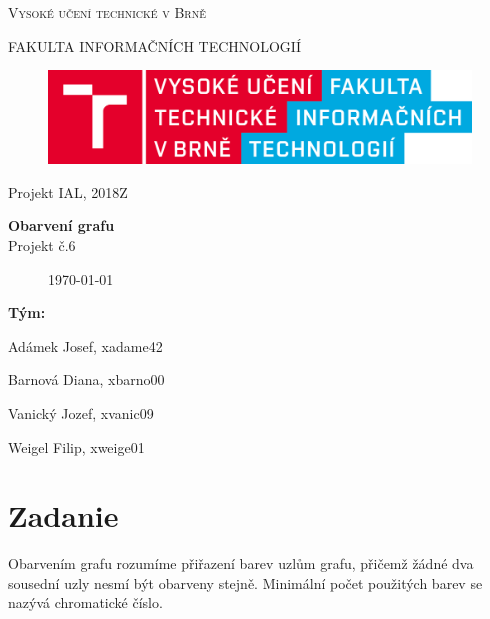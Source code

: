 \documentclass[a4paper,11pt]{article}
\begin{document}

\begin{titlepage}
\begin{center}
    {\Huge \textsc{Vysoké učení technické v Brně}}
    
    {\LARGE \uppercase{FAKULTA INFORMAČNÍCH TECHNOLOGIÍ}}
    
\begin{figure}[h]
\vspace{5.0cm}
\centering
\includegraphics[scale=0.15]{logo.png}
\vspace{-10.0cm}
\end{figure}
    
	{\LARGE Projekt IAL, 2018Z}

	{\Huge \textbf{Obarvení grafu}}
\\

{\LARGE {Projekt č.6}}\\

\begin{figure}[h]
\centering
{\Large {\mydate\today}}
\vspace{6cm}
\end{figure}

\end{center}
\begin{compactitem}
\item[] \textbf{Tým:}
\item[] Adámek Josef, xadame42
\item[] Barnová Diana, xbarno00
\item[] Vanický Jozef, xvanic09
\item[] Weigel Filip, xweige01
\end{compactitem}

\end{titlepage}

\tableofcontents
\newpage

\section{Zadanie}
Obarvením grafu rozumíme přiřazení barev uzlům grafu, přičemž žádné dva sousední uzly nesmí být obarveny stejně. Minimální počet použitých barev se nazývá chromatické číslo. 
\end{document}
